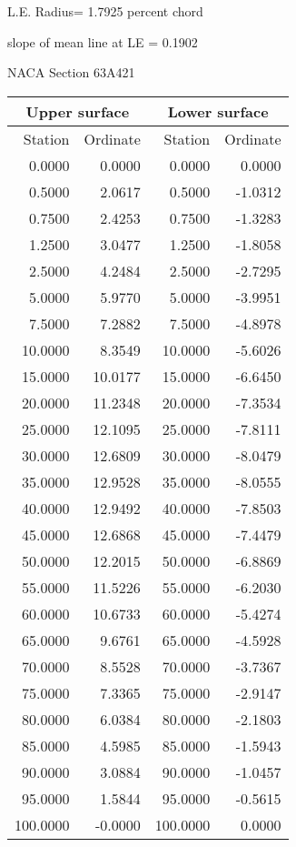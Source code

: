\documentclass[11pt]{book}
\begin{document}
L.E. Radius=  1.7925 percent chord


 slope of mean line at LE =  0.1902
 \newpage
  \label{s63A421}
 \begin{Large}
 NACA Section 63A421
 \end{Large}
  
 \vspace{8mm}
 \begin{tabular}{|r|r|r|r|} \hline 
 \multicolumn{2}{|c|}{Upper surface} & \multicolumn{2}{|c|}{Lower surface} \\
 \hline
 Station & Ordinate & Station & Ordinate \\
 \hline
0.0000 & 0.0000 & 0.0000 & 0.0000 \\
0.5000 & 2.0617 & 0.5000 & -1.0312 \\
0.7500 & 2.4253 & 0.7500 & -1.3283 \\
1.2500 & 3.0477 & 1.2500 & -1.8058 \\
2.5000 & 4.2484 & 2.5000 & -2.7295 \\
5.0000 & 5.9770 & 5.0000 & -3.9951 \\
7.5000 & 7.2882 & 7.5000 & -4.8978 \\
10.0000 & 8.3549 & 10.0000 & -5.6026 \\
15.0000 & 10.0177 & 15.0000 & -6.6450 \\
20.0000 & 11.2348 & 20.0000 & -7.3534 \\
25.0000 & 12.1095 & 25.0000 & -7.8111 \\
30.0000 & 12.6809 & 30.0000 & -8.0479 \\
35.0000 & 12.9528 & 35.0000 & -8.0555 \\
40.0000 & 12.9492 & 40.0000 & -7.8503 \\
45.0000 & 12.6868 & 45.0000 & -7.4479 \\
50.0000 & 12.2015 & 50.0000 & -6.8869 \\
55.0000 & 11.5226 & 55.0000 & -6.2030 \\
60.0000 & 10.6733 & 60.0000 & -5.4274 \\
65.0000 & 9.6761 & 65.0000 & -4.5928 \\
70.0000 & 8.5528 & 70.0000 & -3.7367 \\
75.0000 & 7.3365 & 75.0000 & -2.9147 \\
80.0000 & 6.0384 & 80.0000 & -2.1803 \\
85.0000 & 4.5985 & 85.0000 & -1.5943 \\
90.0000 & 3.0884 & 90.0000 & -1.0457 \\
95.0000 & 1.5844 & 95.0000 & -0.5615 \\
100.0000 & -0.0000 & 100.0000 & 0.0000 \\
 \hline 
 \end{tabular}
\end{document}
